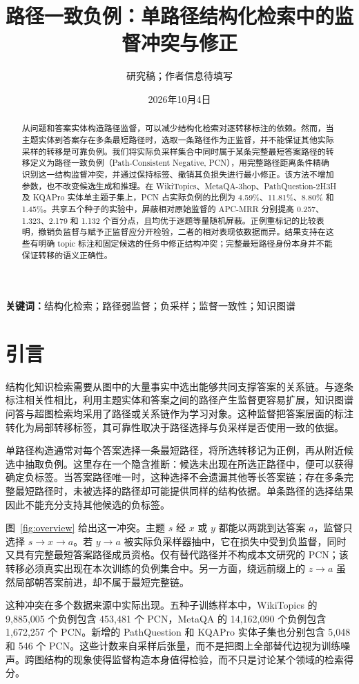 \documentclass[UTF8,a4paper,10pt,fontset=fandol]{ctexart}
\title{路径一致负例：单路径结构化检索中的监督冲突与修正}
\author{研究稿；作者信息待填写}
\date{2026年10月4日}
\begin{document}
\maketitle

\begin{abstract}
从问题和答案实体构造路径监督，可以减少结构化检索对逐转移标注的依赖。然而，当主题实体到答案存在多条最短路径时，选取一条路径作为正监督，并不能保证其他实际采样的转移是可靠负例。我们将实际负采样集合中同时属于某条完整最短答案路径的转移定义为路径一致负例（Path-Consistent Negative, PCN），用完整路径距离条件精确识别这一结构监督冲突，并通过保持标签、撤销其负损失进行最小修正。该方法不增加参数，也不改变候选生成和推理。在 WikiTopics、MetaQA-3hop、PathQuestion-2H3H 及 KQAPro 实体单主题子集上，PCN 占实际负例的比例为 4.59\%、11.81\%、8.80\% 和 1.45\%。共享五个种子的实验中，屏蔽相对原始监督的 APC-MRR 分别提高 0.257、1.323、2.179 和 1.132 个百分点，且均优于逐题等量随机屏蔽。正例重标记的比较表明，撤销负监督与赋予正监督应分开检验，二者的相对表现依数据而异。结果支持在这些有明确 topic 标注和固定候选的任务中修正结构冲突；完整最短路径身份本身并不能保证转移的语义正确性。
\end{abstract}
\noindent\textbf{关键词：}结构化检索；路径弱监督；负采样；监督一致性；知识图谱

\section{引言}
结构化知识检索需要从图中的大量事实中选出能够共同支撑答案的关系链。与逐条标注相关性相比，利用主题实体和答案之间的路径产生监督更容易扩展，知识图谱问答与超图检索均采用了路径或关系链作为学习对象\cite{metaqa,pq,hyperrag}。这种监督把答案层面的标注转化为局部转移标签，其可靠性取决于路径选择与负采样是否使用一致的依据。

单路径构造通常对每个答案选择一条最短路径，将所选转移记为正例，再从附近候选中抽取负例。这里存在一个隐含推断：候选未出现在所选正路径中，便可以获得确定负标签。当答案路径唯一时，这种选择不会遗漏其他等长答案链；存在多条完整最短路径时，未被选择的路径却可能提供同样的结构依据。单条路径的选择结果因此不能充分支持其他候选的负标签。

图~\ref{fig:overview} 给出这一冲突。主题 $s$ 经 $x$ 或 $y$ 都能以两跳到达答案 $a$，监督只选择 $s\to x\to a$。若 $y\to a$ 被实际负采样器抽中，它在损失中受到负监督，同时又具有完整最短答案路径成员资格。仅有替代路径并不构成本文研究的 PCN；该转移必须真实出现在本次训练的负例集合中。另一方面，绕远前缀上的 $z\to a$ 虽然局部朝答案前进，却不属于最短完整链。

这种冲突在多个数据来源中实际出现。五种子训练样本中，WikiTopics 的 9,885,005 个负例包含 453,481 个 PCN，MetaQA 的 14,162,090 个负例包含 1,672,257 个 PCN。新增的 PathQuestion 和 KQAPro 实体子集也分别包含 5,048 和 546 个 PCN。这些计数来自采样后张量，而不是把图上全部替代边视为训练噪声。跨图结构的现象使得监督构造本身值得检验，而不只是讨论某个领域的检索得分。
\end{document}

